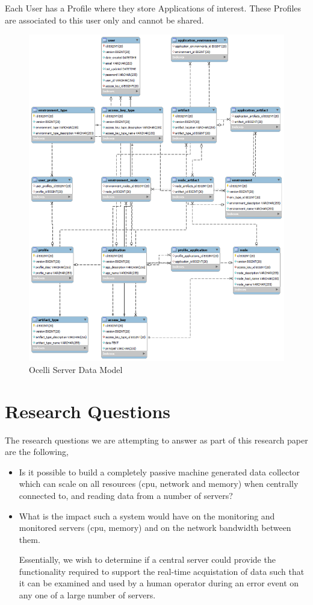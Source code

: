 \documentclass{llncs}
\begin{document}
Each User has a Profile where they store Applications of interest. These Profiles are associated to this user only and cannot be shared.

\begin{figure}[p]
    \centering
    \includegraphics[scale=0.45]{ocelli.png}
    \caption{Ocelli Server Data Model}
    \label{fig:ocelli_dm}
\end{figure}

\section{Research Questions}

The research questions we are attempting to answer as part of this research paper are the following,

\begin{itemize}
\item Is it possible to build a completely passive machine generated data collector which can scale on all resources (cpu, network and memory) when centrally connected to, and reading data from a number of servers?
\item What is the impact such a system would have on the monitoring and monitored servers (cpu, memory) and on the network bandwidth between them.

Essentially, we wish to determine if a central server could provide the functionality required to support the real-time acquistation of data such that it can be examined and used by a human operator during an error event on any one of a large number of servers.
\end{itemize}
\end{document}
